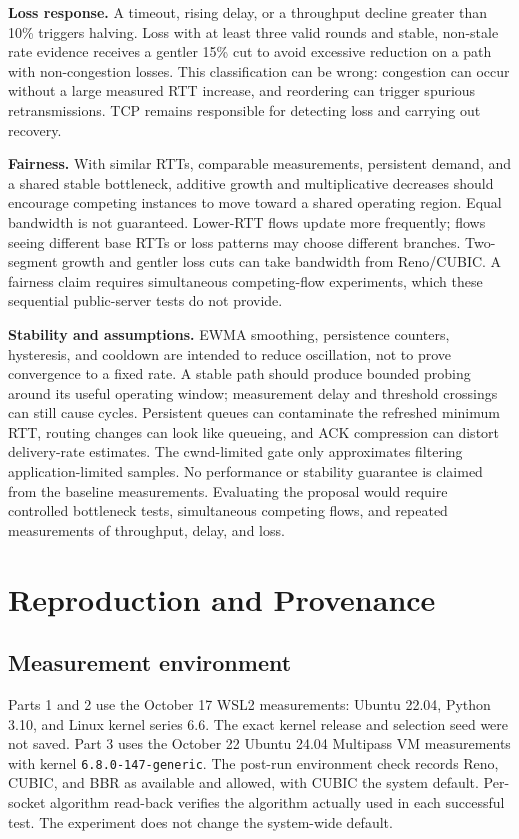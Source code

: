 \documentclass[11pt,letterpaper]{article}
\begin{document}
\textbf{Loss response.} A timeout, rising delay, or a throughput decline greater
than 10\% triggers halving. Loss with at least three valid rounds and stable, non-stale rate evidence
receives a gentler 15\% cut to avoid excessive reduction on a path with non-congestion losses. This
classification can be wrong: congestion can occur without a large measured RTT
increase, and reordering can trigger spurious retransmissions. TCP remains
responsible for detecting loss and carrying out recovery.

\textbf{Fairness.} With similar RTTs, comparable measurements, persistent demand,
and a shared stable bottleneck, additive growth and multiplicative decreases
should encourage competing instances to move toward a shared operating region.
Equal bandwidth is not guaranteed. Lower-RTT flows update more frequently;
flows seeing different base RTTs or loss patterns may choose different branches.
Two-segment growth and gentler loss cuts can take bandwidth from Reno/CUBIC.
A fairness claim requires simultaneous competing-flow experiments, which these
sequential public-server tests do not provide.

\textbf{Stability and assumptions.} EWMA smoothing, persistence counters,
hysteresis, and cooldown are intended to reduce oscillation, not to prove
convergence to a fixed rate. A stable path should produce bounded probing around
its useful operating window; measurement delay and threshold crossings can
still cause cycles. Persistent queues can contaminate the refreshed minimum
RTT, routing changes can look like queueing, and ACK compression can distort
delivery-rate estimates. The cwnd-limited gate only approximates filtering
application-limited samples. No performance or stability guarantee is claimed
from the baseline measurements. Evaluating the proposal would require
controlled bottleneck tests, simultaneous competing flows, and repeated
measurements of throughput, delay, and loss.


\clearpage

\clearpage\section{Reproduction and Provenance}\label{sec:reproduce}

\subsection{Measurement environment}

Parts 1 and 2 use the October 17 WSL2 measurements: Ubuntu 22.04, Python 3.10,
and Linux kernel series 6.6. The exact kernel release and selection seed were
not saved. Part 3 uses the October 22 Ubuntu 24.04 Multipass VM measurements
with kernel \texttt{6.8.0-147-generic}. The post-run environment check records
Reno, CUBIC, and BBR as available and allowed, with CUBIC the system default.
Per-socket algorithm read-back verifies the algorithm actually used in each
successful test. The experiment does not change the system-wide default.
\end{document}
